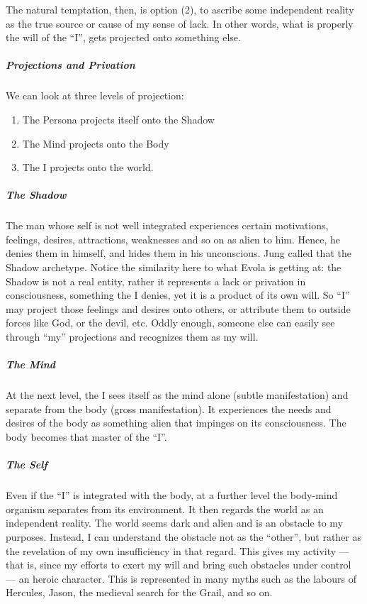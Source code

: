 The natural temptation, then, is option (2), to ascribe some independent reality as the true source or cause of my sense of lack. In other words, what is properly the will of the ``I'', gets projected onto something else.

\subparagraph{Projections and Privation}


We can look at three levels of projection:

\begin{enumerate}


\item The Persona projects itself onto the Shadow

\item The Mind projects onto the Body

\item The I projects onto the world.
\end{enumerate}

\subparagraph{The Shadow}


The man whose self is not well integrated experiences certain motivations, feelings, desires, attractions, weaknesses and so on as alien to him. Hence, he denies them in himself, and hides them in his unconscious. Jung called that the Shadow archetype. Notice the similarity here to what Evola is getting at: the Shadow is not a real entity, rather it represents a lack or privation in consciousness, something the I denies, yet it is a product of its own will. So ``I'' may project those feelings and desires onto others, or attribute them to outside forces like God, or the devil, etc. Oddly enough, someone else can easily see through ``my'' projections and recognizes them as my will.

\subparagraph{The Mind}


At the next level, the I sees itself as the mind alone (subtle manifestation) and separate from the body (gross manifestation). It experiences the needs and desires of the body as something alien that impinges on its consciousness. The body becomes that master of the ``I''.

\subparagraph{The Self}


Even if the ``I'' is integrated with the body, at a further level the body-mind organism separates from its environment. It then regards the world as an independent reality. The world seems dark and alien and is an obstacle to my purposes. Instead, I can understand the obstacle not as the ``other'', but rather as the revelation of my own insufficiency in that regard. This gives my activity --- that is, since my efforts to exert my will and bring such obstacles under control --- an heroic character. This is represented in many myths such as the labours of Hercules, Jason, the medieval search for the Grail, and so on.

